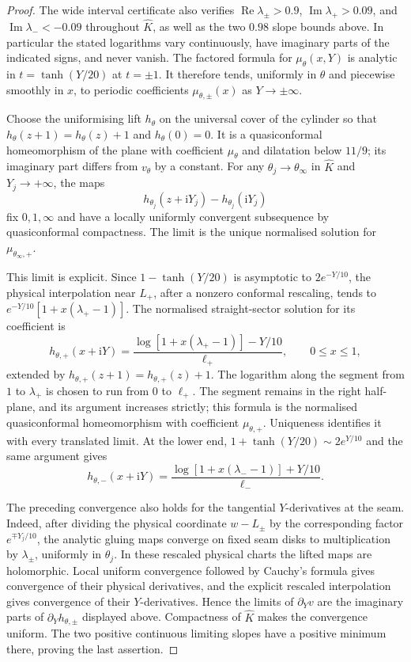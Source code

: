 \documentclass[11pt,a4paper]{article}
\theoremstyle{definition}
\newcommand{\ii}{\mathrm{i}}
\begin{document}
\begin{proof}
The wide interval certificate also verifies
$\operatorname{Re}\lambda_\pm>0.9$,
$\operatorname{Im}\lambda_+>0.09$, and
$\operatorname{Im}\lambda_-<-0.09$ throughout $\widehat K$,
as well as the two $0.98$ slope bounds above.
In particular the stated logarithms vary continuously, have
imaginary parts of the indicated signs, and never vanish.
The factored formula for $\mu_\theta(x,Y)$ is analytic in
$t=\tanh(Y/20)$ at $t=\pm1$.  It therefore tends, uniformly in
$\theta$ and piecewise smoothly in $x$, to periodic coefficients
$\mu_{\theta,\pm}(x)$ as $Y\to\pm\infty$.

Choose the uniformising lift $h_\theta$ on the universal cover of
the cylinder so that $h_\theta(z+1)=h_\theta(z)+1$ and
$h_\theta(0)=0$.  It is a quasiconformal homeomorphism of the
plane with coefficient $\mu_\theta$ and dilatation below $11/9$;
its imaginary part differs from $v_\theta$ by a constant.
For any $\theta_j\to\theta_\infty$ in $\widehat K$ and
$Y_j\to+\infty$, the maps
\[
 h_{\theta_j}(z+\ii Y_j)-h_{\theta_j}(\ii Y_j)
\]
fix $0,1,\infty$ and have a locally uniformly convergent
subsequence by quasiconformal compactness.  The limit is the unique
normalised solution for $\mu_{\theta_\infty,+}$.

This limit is explicit.  Since $1-\tanh(Y/20)$ is asymptotic to
$2e^{-Y/10}$, the physical interpolation near $L_+$, after a
nonzero conformal rescaling, tends to
$e^{-Y/10}[1+x(\lambda_+-1)]$.  The normalised straight-sector
solution for its coefficient is
\[
 h_{\theta,+}(x+\ii Y)=
 \frac{\log[1+x(\lambda_+-1)]-Y/10}{\ell_+},
 \qquad 0\le x\le1,
\]
extended by $h_{\theta,+}(z+1)=h_{\theta,+}(z)+1$.
The logarithm along the segment from $1$ to $\lambda_+$ is chosen
to run from $0$ to $\ell_+$.  The segment remains in the right
half-plane, and its argument increases strictly; this formula is
the normalised quasiconformal homeomorphism with coefficient
$\mu_{\theta,+}$.  Uniqueness identifies it with every translated
limit.  At the lower end, $1+\tanh(Y/20)\sim2e^{Y/10}$ and the
same argument gives
\[
 h_{\theta,-}(x+\ii Y)=
 \frac{\log[1+x(\lambda_--1)]+Y/10}{\ell_-}.
\]

The preceding convergence also holds for the tangential
$Y$-derivatives at the seam.  Indeed, after dividing the physical
coordinate $w-L_\pm$ by the corresponding factor
$e^{\mp Y_j/10}$, the analytic gluing maps converge on fixed
seam disks to multiplication by $\lambda_\pm$, uniformly in
$\theta_j$.  In these rescaled physical charts the lifted maps
are holomorphic.  Local uniform convergence followed by Cauchy's
formula gives convergence of their physical derivatives, and the
explicit rescaled interpolation gives convergence of their
$Y$-derivatives.  Hence the limits of $\partial_Yv$ are the
imaginary parts of $\partial_Yh_{\theta,\pm}$ displayed above.
Compactness of $\widehat K$ makes the convergence uniform.
The two positive continuous limiting slopes have a positive
minimum there, proving the last assertion.
\end{proof}
\end{document}
